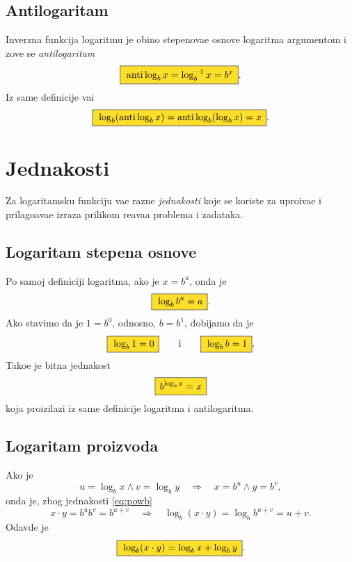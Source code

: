 \documentclass[12pt, twoside, a4paper]{article}
\def\logb{\log_b}
\def\okvir#1{\fcolorbox{black}{Goldenrod}{$\,\displaystyle{\mathstrut #1}\,$}}
\def\sledi{{\quad\Rightarrow\quad}}
\begin{document}
\subsection{Antilogaritam}

\def\antilog{\mathop{\rm anti\,log}\nolimits}
Inverzna funkcija logaritmu
je obi{\cv}no stepenova{\nj}e osnove logaritma argumentom i zove se {\sl antilogaritam}
\begin{equation}
\okvir{\antilog_bx = \logb^{-1}x =  b^x}.
\end{equation}
Iz same definicije va{\zv}i
\begin{equation}
\okvir{\log_b(\antilog_b x)=\antilog_b(\log_b x)=x}.
\end{equation}



\section{Jednakosti}

Za logaritamsku funkciju va{\zv}e razne {\sl jednakosti\/} koje se koriste za 
upro{\sv}{\cc}iva{\nj}e i pri\-la\-go\-{\dj}a\-va\-{\nj}e izraza prilikom re{\sv}ava{\nj}a
problema i zadataka.

\subsection{Logaritam stepena osnove}

Po samoj definiciji logaritma, ako je $x=b^a$, onda je
\begin{equation}
\okvir{\logb b^a=a}.
\label{eq:powb}
\end{equation}
Ako stavimo da je $1=b^0$, odnosno, $b=b^1$, dobijamo da je
\begin{equation}
\okvir{\logb 1=0}\qquad\text{i}\qquad\okvir{\logb b=1}.
\end{equation}
Tako{\dj}e je bitna jednakost
\begin{equation}
\okvir{b^{\logb x}=x}
\end{equation}
koja proizilazi iz same definicije logaritma i antilogaritma.

\subsection{Logaritam proizvoda}

Ako je
$$
u=\logb x\land v=\log_b y \sledi x=b^u\land y=b^v,
$$
onda je, zbog jednakosti \eqref{eq:powb}
$$
x\cdot y=b^ub^v=b^{u+v}\sledi \logb(x\cdot y)=\logb b^{u+v}=u+v.
$$
Odavde je
\begin{equation}
\okvir{\logb(x\cdot y)=\logb x+\logb y}.
\label{eq:lnmul}
\end{equation}
\end{document}
